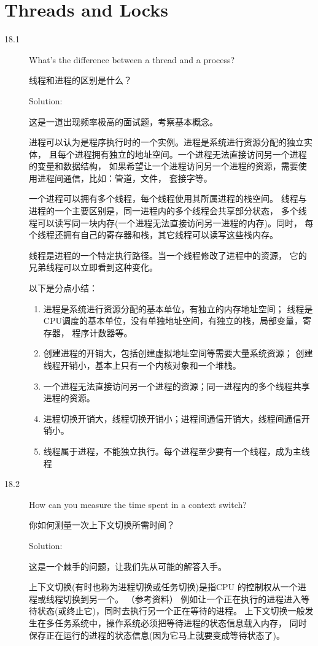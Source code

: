 \chapter{Threads and Locks}

\begin{description}
\item[18.1] What’s the difference between a thread and a process?

线程和进程的区别是什么？

Solution: 

这是一道出现频率极高的面试题，考察基本概念。

进程可以认为是程序执行时的一个实例。进程是系统进行资源分配的独立实体， 且每个进程拥有独立的地址空间。一个进程无法直接访问另一个进程的变量和数据结构， 如果希望让一个进程访问另一个进程的资源，需要使用进程间通信，比如：管道，文件， 套接字等。

一个进程可以拥有多个线程，每个线程使用其所属进程的栈空间。 线程与进程的一个主要区别是，同一进程内的多个线程会共享部分状态， 多个线程可以读写同一块内存(一个进程无法直接访问另一进程的内存)。同时， 每个线程还拥有自己的寄存器和栈，其它线程可以读写这些栈内存。

线程是进程的一个特定执行路径。当一个线程修改了进程中的资源， 它的兄弟线程可以立即看到这种变化。

以下是分点小结：
\begin{enumerate}
\item 进程是系统进行资源分配的基本单位，有独立的内存地址空间； 线程是CPU调度的基本单位，没有单独地址空间，有独立的栈，局部变量，寄存器， 程序计数器等。
\item 创建进程的开销大，包括创建虚拟地址空间等需要大量系统资源； 创建线程开销小，基本上只有一个内核对象和一个堆栈。
\item 一个进程无法直接访问另一个进程的资源；同一进程内的多个线程共享进程的资源。
\item 进程切换开销大，线程切换开销小；进程间通信开销大，线程间通信开销小。
\item 线程属于进程，不能独立执行。每个进程至少要有一个线程，成为主线程
\end{enumerate}

\item[18.2] How can you measure the time spent in a context switch?

你如何测量一次上下文切换所需时间？

Solution: 

这是一个棘手的问题，让我们先从可能的解答入手。

上下文切换(有时也称为进程切换或任务切换)是指CPU 的控制权从一个进程或线程切换到另一个。 （参考资料） 例如让一个正在执行的进程进入等待状态(或终止它)，同时去执行另一个正在等待的进程。 上下文切换一般发生在多任务系统中，操作系统必须把等待进程的状态信息载入内存， 同时保存正在运行的进程的状态信息(因为它马上就要变成等待状态了)。


\end{description}
